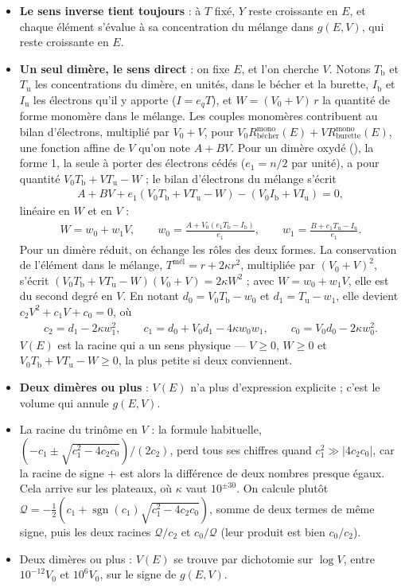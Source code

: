 \documentclass[a4paper,11pt]{article}
\newcommand\gras[1]{\textbf{#1}}
\newcommand\pare[1]{\left(#1\right)}
\newcommand\Rb{R_\text{bécher}}
\newcommand\Ru{R_\text{burette}}
\begin{document}
\begin{itemize}
\item \gras{Le sens inverse tient toujours} : à $T$ fixé, $Y$ reste croissante en $E$, et chaque élément s'évalue à sa concentration du mélange dans $g(E,V)$, qui reste croissante en $E$.
\item \gras{Un seul dimère, le sens direct} : on fixe $E$, et l'on cherche $V$.
Notons $T_\text{b}$ et $T_\text{u}$ les concentrations du dimère, en unités, dans le bécher et la burette, $I_\text{b}$ et $I_\text{u}$ les électrons qu'il y apporte ($I=e_qT$), et $W=(V_0+V)\,r$ la quantité de forme monomère dans le mélange.
Les couples monomères contribuent au bilan d'électrons, multiplié par $V_0+V$, pour $V_0\Rb^\text{mono}(E)+V\Ru^\text{mono}(E)$, une fonction affine de $V$ qu'on note $A+BV$.
Pour un dimère oxydé (), la forme 1, la seule à porter des électrons cédés ($e_1=n/2$ par unité), a pour quantité $V_0T_\text{b}+VT_\text{u}-W$ ; le bilan d'électrons du mélange s'écrit
\begin{align}
A+BV+e_1\pare{V_0T_\text{b}+VT_\text{u}-W}-\pare{V_0I_\text{b}+VI_\text{u}}=0,
\end{align}
linéaire en $W$ et en $V$ :
\begin{align}
W=w_0+w_1V,\qquad w_0=\frac{A+V_0\pare{e_1T_\text{b}-I_\text{b}}}{e_1},\qquad w_1=\frac{B+e_1T_\text{u}-I_\text{u}}{e_1}.
\end{align}
Pour un dimère réduit, on échange les rôles des deux formes.
La conservation de l'élément dans le mélange, $T^\text{mél}=r+2\kappa r^2$, multipliée par $(V_0+V)^2$, s'écrit $\pare{V_0T_\text{b}+VT_\text{u}-W}(V_0+V)=2\kappa W^2$ ; avec $W=w_0+w_1V$, elle est du second degré en $V$.
En notant $d_0=V_0T_\text{b}-w_0$ et $d_1=T_\text{u}-w_1$, elle devient $c_2V^2+c_1V+c_0=0$, où
\begin{align}
c_2=d_1-2\kappa w_1^2,\qquad c_1=d_0+V_0d_1-4\kappa w_0w_1,\qquad c_0=V_0d_0-2\kappa w_0^2.
\end{align}
$V(E)$ est la racine qui a un sens physique — $V\ge0$, $W\ge0$ et $V_0T_\text{b}+VT_\text{u}-W\ge0$, la plus petite si deux conviennent.
\item \gras{Deux dimères ou plus} : $V(E)$ n'a plus d'expression explicite ; c'est le volume qui annule $g(E,V)$.
\end{itemize}
\begin{algo}
\begin{itemize}
\item La racine du trinôme en $V$ : la formule habituelle, $\pare{-c_1\pm\sqrt{c_1^2-4c_2c_0}}/(2c_2)$, perd tous ses chiffres quand $c_1^2\gg|4c_2c_0|$, car la racine de signe $+$ est alors la différence de deux nombres presque égaux.
Cela arrive sur les plateaux, où $\kappa$ vaut $10^{\pm30}$.
On calcule plutôt $\mathcal Q=-\frac12\pare{c_1+\operatorname{sgn}(c_1)\sqrt{c_1^2-4c_2c_0}}$, somme de deux termes de même signe, puis les deux racines $\mathcal Q/c_2$ et $c_0/\mathcal Q$ (leur produit est bien $c_0/c_2$).
\item Deux dimères ou plus : $V(E)$ se trouve par dichotomie sur $\log V$, entre $10^{-12}V_0$ et $10^6V_0$, sur le signe de $g(E,V)$.
\end{itemize}
\end{algo}
\end{document}
